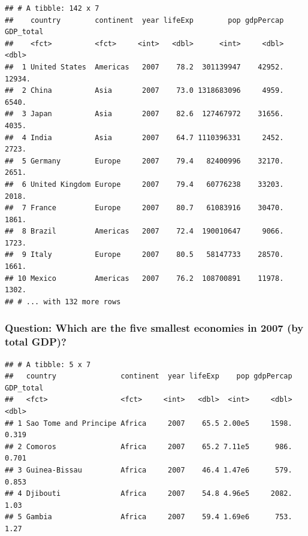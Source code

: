 \documentclass[]{article}
\newenvironment{Shaded}{\begin{snugshade}}{\end{snugshade}}
\newcommand{\KeywordTok}[1]{\textcolor[rgb]{0.13,0.29,0.53}{\textbf{#1}}}
\newcommand{\DecValTok}[1]{\textcolor[rgb]{0.00,0.00,0.81}{#1}}
\newcommand{\StringTok}[1]{\textcolor[rgb]{0.31,0.60,0.02}{#1}}
\newcommand{\OperatorTok}[1]{\textcolor[rgb]{0.81,0.36,0.00}{\textbf{#1}}}
\newcommand{\NormalTok}[1]{#1}
\begin{document}
\begin{verbatim}
## # A tibble: 142 x 7
##    country        continent  year lifeExp        pop gdpPercap GDP_total
##    <fct>          <fct>     <int>   <dbl>      <int>     <dbl>     <dbl>
##  1 United States  Americas   2007    78.2  301139947    42952.    12934.
##  2 China          Asia       2007    73.0 1318683096     4959.     6540.
##  3 Japan          Asia       2007    82.6  127467972    31656.     4035.
##  4 India          Asia       2007    64.7 1110396331     2452.     2723.
##  5 Germany        Europe     2007    79.4   82400996    32170.     2651.
##  6 United Kingdom Europe     2007    79.4   60776238    33203.     2018.
##  7 France         Europe     2007    80.7   61083916    30470.     1861.
##  8 Brazil         Americas   2007    72.4  190010647     9066.     1723.
##  9 Italy          Europe     2007    80.5   58147733    28570.     1661.
## 10 Mexico         Americas   2007    76.2  108700891    11978.     1302.
## # ... with 132 more rows
\end{verbatim}

\subsubsection{Question: Which are the five smallest economies in 2007
(by total
GDP)?}\label{question-which-are-the-five-smallest-economies-in-2007-by-total-gdp}

\begin{Shaded}
\end{Shaded}

\begin{verbatim}
## # A tibble: 5 x 7
##   country               continent  year lifeExp    pop gdpPercap GDP_total
##   <fct>                 <fct>     <int>   <dbl>  <int>     <dbl>     <dbl>
## 1 Sao Tome and Principe Africa     2007    65.5 2.00e5     1598.     0.319
## 2 Comoros               Africa     2007    65.2 7.11e5      986.     0.701
## 3 Guinea-Bissau         Africa     2007    46.4 1.47e6      579.     0.853
## 4 Djibouti              Africa     2007    54.8 4.96e5     2082.     1.03 
## 5 Gambia                Africa     2007    59.4 1.69e6      753.     1.27
\end{verbatim}
\end{document}
